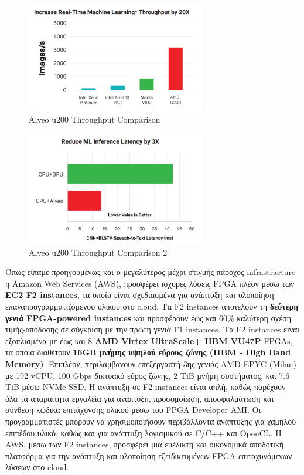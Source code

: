 \begin{figure}[h!]
  \centering
  \includegraphics[width=0.7\textwidth]{figures/chapter3/u200_throughput_comparison.png}
  \caption{Alveo u200 Throughput Comparison}
  \label{fig:u200_throughput_comparison}
\end{figure}
\begin{figure}[h!]
  \centering
  \includegraphics[width=0.7\textwidth]{figures/chapter3/cnn_u200.png}
  \caption{Alveo u200 Throughput Comparison 2}
  \label{fig:cnn_u200.png}
\end{figure}

Όπως είπαμε προηγουμένως και ο μεγαλύτερος μέχρι στιγμής πάροχος infrastracture η Amazon Web Services (AWS), προσφέρει ισχυρές λύσεις FPGA πλέον μέσω των \textbf{EC2 F2 instances},
τα οποία είναι σχεδιασμένα για ανάπτυξη και υλοποίηση επαναπρογραμματιζόμενου υλικού στο cloud.
Τα F2 instances αποτελούν τη \textbf{δεύτερη γενιά FPGA-powered instances} και προσφέρουν έως και 60\% καλύτερη σχέση τιμής-απόδοσης σε σύγκριση με την πρώτη γενιά F1 instances.
Τα F2 instances είναι εξοπλισμένα με έως και 8 \textbf{AMD Virtex UltraScale+ HBM VU47P} FPGAs, τα οποία διαθέτουν \textbf{16GB μνήμης υψηλού εύρους ζώνης (HBM - High Band Memory)}.
Επιπλέον, περιλαμβάνουν επεξεργαστή 3ης γενιάς AMD EPYC (Milan) με 192 vCPU, 100 Gbps δικτυακό εύρος ζώνης, 2 TiB μνήμη συστήματος, και 7.6 TiB μέσω NVMe SSD.
Η ανάπτυξη σε F2 instances είναι απλή, καθώς παρέχουν όλα τα απαραίτητα εργαλεία για ανάπτυξη, προσομοίωση, αποσφαλμάτωση και σύνθεση κώδικα επιτάχυνσης υλικού μέσω του FPGA Developer AMI.
Οι προγραμματιστές μπορούν να χρησιμοποιήσουν περιβάλλοντα ανάπτυξης για χαμηλού επιπέδου υλικό, καθώς και για ανάπτυξη λογισμικού σε C/C++ και OpenCL.
Η AWS, μέσω των F2 instances, προσφέρει μια ευέλικτη και οικονομικά αποδοτική πλατφόρμα για την ανάπτυξη και υλοποίηση εξειδικευμένων FPGA-επιταχυνόμενων λύσεων στο cloud.

